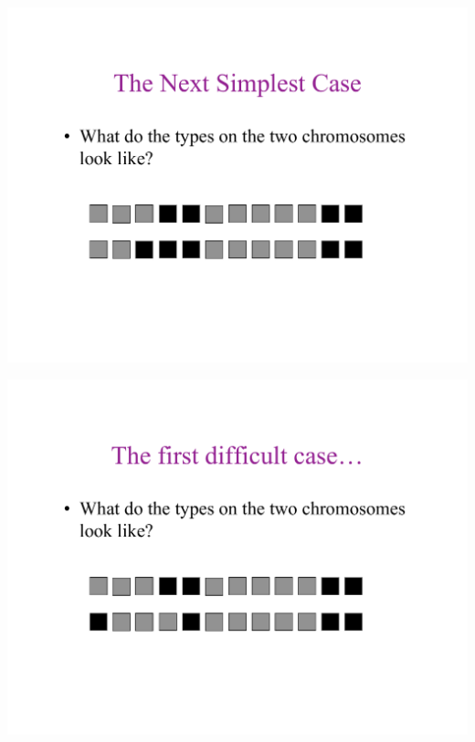 \newslide{}
\mbox{}
\vspace*{\VertUp}
\enlargethispage*{1000pt}
\begin{center}
\includegraphics*[width=\textwidth]{PPT_pages/pg_0013.pdf}
\end{center}


\newslide{}
\mbox{}
\vspace*{\VertUp}
\enlargethispage*{1000pt}
\begin{center}
\includegraphics*[width=\textwidth]{PPT_pages/pg_0014.pdf}
\end{center}


